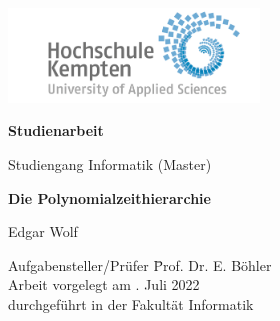 \thispagestyle{empty}



\vspace*{-20mm}
\begin{flushright}
\includegraphics[width=0.5\textwidth]{Bilder/LogoHS.png}
\end{flushright}


\vspace*{2cm}

\begin{center}
{\Large \textbf{Studienarbeit}}\\ 

\vspace*{1cm}

{\large Studiengang Informatik (Master)\\[1mm]}

\vspace{1cm}

{\Large \bfseries Die Polynomialzeithierarchie}


\vspace{1.5cm}

{\large Edgar Wolf}\\[40mm]

\end{center}

\vfill

\parbox{120mm}{
\begin{tabbing}
Aufgabensteller/Prüfer \hspace{.7cm} \= Prof. Dr. E. Böhler\\
Arbeit vorgelegt am                  . Juli 2022\\
durchgeführt in der                  \> Fakultät Informatik\\[4mm]
\end{tabbing}
}

